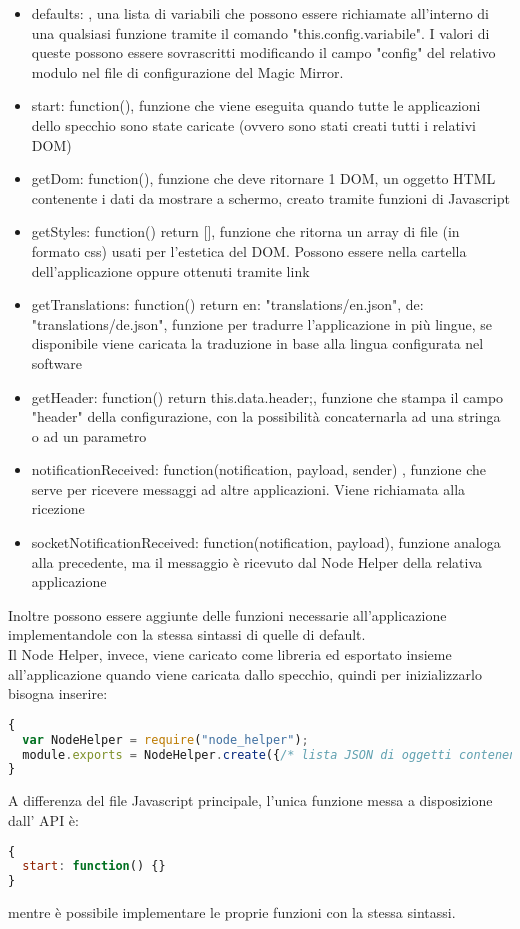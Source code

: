 \begin{itemize}
\item defaults: {}, una lista di variabili che possono essere richiamate all'interno di una qualsiasi funzione tramite il comando "this.config.variabile".
I valori di queste possono essere sovrascritti modificando il campo "config" del relativo modulo nel file di configurazione del Magic Mirror.
\item start: function(){}, funzione che viene eseguita quando tutte le applicazioni dello specchio sono state caricate (ovvero sono stati creati tutti i relativi DOM)
\item getDom: function(){}, funzione che deve ritornare 1 DOM, un oggetto HTML contenente i dati da mostrare a schermo, creato tramite funzioni di Javascript
\item getStyles: function() { return []}, funzione che ritorna un array di file (in formato css) usati per l'estetica del DOM. Possono essere nella cartella dell'applicazione
oppure ottenuti tramite link
\item getTranslations: function() {	return {en: "translations/en.json", de: "translations/de.json"}}, funzione per tradurre l'applicazione in pi\`u lingue,
se disponibile viene caricata la traduzione in base alla lingua configurata nel software
\item getHeader: function() {	return this.data.header;}, funzione che stampa il campo "header" della configurazione, con la possibilit\`a concaternarla
ad una stringa o ad un parametro
\item notificationReceived: function(notification, payload, sender) {}, funzione che serve per ricevere messaggi ad altre applicazioni. Viene richiamata alla ricezione
\item socketNotificationReceived: function(notification, payload){}, funzione analoga alla precedente, ma il messaggio \`e ricevuto dal Node Helper della relativa applicazione\\[1\baselineskip]
\end{itemize}
Inoltre possono essere aggiunte delle funzioni necessarie all'applicazione implementandole con la stessa sintassi di quelle di default.
\\[1\baselineskip]
Il Node Helper, invece, viene caricato come libreria ed esportato insieme all'applicazione quando viene caricata dallo specchio, quindi per inizializzarlo bisogna
inserire:
\begin{lstlisting}[language=JavaScript]
{
  var NodeHelper = require("node_helper");
  module.exports = NodeHelper.create({/* lista JSON di oggetti contenenti funzioni*/});
}
\end{lstlisting}
A differenza del file Javascript principale, l'unica funzione messa a disposizione dall' API \`e:
\begin{lstlisting}[language=JavaScript]
{
  start: function() {}
}
\end{lstlisting}
mentre \`e possibile implementare le proprie funzioni con la stessa sintassi.

